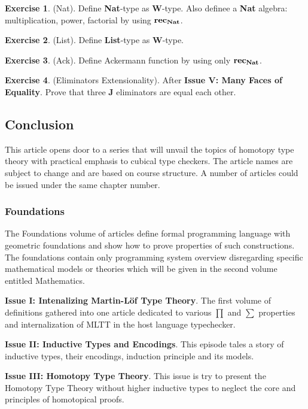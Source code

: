 \documentclass{article}
\theoremstyle{definition}
\newtheorem{exercise}{Exercise}
\begin{document}
\begin{exercise} (Nat). Define {\bf Nat}-type as {\bf W}-type. Also definee a {\bf Nat}
algebra: multiplication, power, factorial by using ${\bf rec_{Nat}}$.
\end{exercise}

\begin{exercise} (List). Define {\bf List}-type as {\bf W}-type.
\end{exercise}

\begin{exercise} (Ack). Define Ackermann function by using only ${\bf rec_{Nat}}$.
\end{exercise}

\begin{exercise} (Eliminators Extensionality). After {\bf Issue V: Many Faces of Equality}. Prove that
three {\bf J} eliminators are equal each other.
\end{exercise}

\subsection*{Conclusion}

This article opens door to a series that will unvail the topics of
homotopy type theory with practical emphasis to cubical type checkers.
The article names are subject to change and are based on course structure.
A number of articles could be issued under the same chapter number.

\subsubsection*{Foundations}

The Foundations volume of articles define formal programming language
with geometric foundations and show how to prove properties of such constructions.
The foundations contain only programming system overview disregarding specific mathematical
models or theories which will be given in the second volume entitled Mathematics.

{\bf Issue I: Intenalizing Martin-Löf Type Theory}.
The first volume of definitions gathered into one article dedicated to
various $\prod$ and $\sum$ properties and internalization of MLTT in the host language typechecker.

{\bf Issue II: Inductive Types and Encodings}.
This episode tales a story of inductive types, their encodings,
induction principle and its models.

{\bf Issue III: Homotopy Type Theory}.
This issue is try to present the Homotopy Type Theory without higher inductive types
to neglect the core and principles of homotopical proofs.
\end{document}
